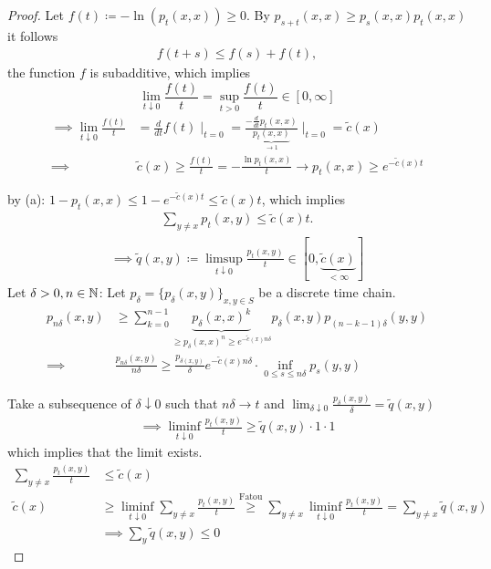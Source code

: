 \begin{proof}
     Let \(f(t)\coloneqq -\ln(p_t(x,x))\geq 0\). By \(p_{s+t}(x,x)\geq p_s(x,x)p_t(x,x)\) it follows 
    \begin{align*}
        f(t+s)\leq f(s)+f(t),
    \end{align*}
    the function \(f\) is subadditive, which implies \[\lim_{t\downarrow 0} \frac{f(t)}{t}=\sup_{t>0}\frac{f(t)}{t}\in[0,\infty]\]
    \begin{align*}
        \implies \lim_{t \downarrow 0}\frac{f(t)}{t}&=\frac{d}{dt}f(t)\mid_{t=0}=\frac{-\frac{d}{dt}p_t(x,x)}{\underbrace{p_t(x,x)}_{\to 1}}\mid_{t=0}=\tilde{c}(x)\\
        \implies & \tilde{c}(x)\geq \frac{f(t)}{t}=-\frac{\ln p_t(x,x)}{t}\to p_t(x,x)\geq e^{-\tilde{c}(x)t}
    \end{align*}

     by (a): \(1-p_t(x,x)\leq 1-e^{-\tilde{c}(x)t}\leq \tilde{c}(x)t\), which implies 
    \begin{align*}
        \sum_{y\neq x} p_t(x,y)\leq\tilde{c}(x)t.
    \end{align*}
    \begin{align*}
    \implies \tilde{q}(x,y)\coloneqq \limsup_{t\downarrow 0} \frac{p_t(x,y)}{t}\in[0,\underbrace{\tilde{c}(x)}_{<\infty}]
    \end{align*}
    Let \(\delta>0,n\in\mathbb{N}\):
    Let \(p_\delta=\{p_\delta(x,y)\}_{x,y\in S}\) be a discrete time chain.
    \begin{align*}
        p_{n\delta}(x,y)&\geq \sum_{k=0}^{n-1}\underbrace{p_{\delta}(x,x)^k}_{\geq p_\delta(x,x)^n\geq e^{-\tilde{c}(x)n\delta}}p_\delta(x,y)p_{(n-k-1)\delta}(y,y)\\
        \implies&\frac{p_{n\delta}(x,y)}{n\delta}\geq \frac{p_{\delta(x,y)}}{\delta}e^{-\tilde{c}(x)n\delta}\cdot \inf_{0\leq s\leq n\delta}p_s(y,y)
    \end{align*}

    Take a subsequence of \(\delta\downarrow 0\) such that \(n\delta\to t\) and 
    \(\lim_{\delta\downarrow 0 }\frac{p_{\delta}(x,y)}{\delta}=\tilde{q}(x,y)\)
    \begin{align*}
        \implies \liminf_{t\downarrow 0}\frac{p_t(x,y)}{t}\geq \tilde{q}(x,y)\cdot 1 \cdot 1
    \end{align*}
    which implies that the limit exists.
    \begin{align*}
        \sum_{y\neq x}\frac{p_t(x,y)}{t}&\leq \tilde{c}(x)\\
        \tilde{c}(x)&\geq \liminf_{t\downarrow 0}\sum_{y\neq x}\frac{p_t(x,y)}{t}\stackrel{\text{Fatou}}{\geq}\sum_{y\neq x}\liminf_{t\downarrow 0}\frac{p_t(x,y)}{t}=\sum_{y\neq x}\tilde{q}(x,y)\\
        &\implies \sum_y \tilde{q}(x,y)\leq 0
    \end{align*}


\end{proof}
